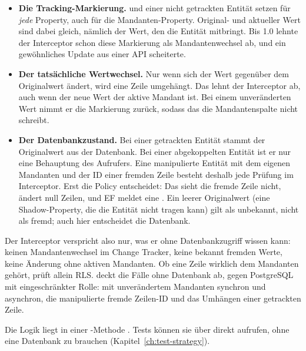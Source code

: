 \begin{itemize}
  \item \textbf{Die Tracking-Markierung.}  und
     einer nicht getrackten Entität setzen  für
    \emph{jede} Property, auch für die Mandanten-Property. Original- und aktueller Wert sind
    dabei gleich, nämlich der Wert, den die Entität mitbringt. Bis 1.0 lehnte der Interceptor
    schon diese Markierung als Mandantenwechsel ab, und ein gewöhnliches Update aus einer API
    scheiterte.
  \item \textbf{Der tatsächliche Wertwechsel.} Nur wenn sich der Wert gegenüber dem
    Originalwert ändert, wird eine Zeile umgehängt. Das lehnt der Interceptor ab, auch wenn
    der neue Wert der aktive Mandant ist. Bei einem unveränderten Wert nimmt er die Markierung
    zurück, sodass das  die Mandantenspalte nicht schreibt.
  \item \textbf{Der Datenbankzustand.} Bei einer getrackten Entität stammt der Originalwert
    aus der Datenbank. Bei einer abgekoppelten Entität ist er nur eine Behauptung des
    Aufrufers. Eine manipulierte Entität mit dem eigenen Mandanten und der ID einer fremden Zeile
    besteht deshalb jede Prüfung im Interceptor. Erst die Policy entscheidet: Das
     sieht die fremde Zeile nicht, ändert null Zeilen, und EF meldet eine
    . Ein leerer
    Originalwert (eine Shadow-Property, die die Entität nicht tragen kann) gilt als unbekannt,
    nicht als fremd; auch hier entscheidet die Datenbank.
\end{itemize}

Der Interceptor verspricht also nur, was er ohne Datenbankzugriff wissen kann: keinen
Mandantenwechsel im Change Tracker, keine bekannt fremden Werte, keine Änderung ohne aktiven
Mandanten. Ob eine Zeile wirklich dem Mandanten gehört, prüft allein RLS.
 deckt die Fälle
ohne Datenbank ab,  gegen PostgreSQL mit
eingeschränkter Rolle:  mit unverändertem Mandanten synchron und asynchron, die
manipulierte fremde Zeilen-ID und das Umhängen einer getrackten Zeile.

Die Logik liegt in einer -Methode . Tests
können sie über  direkt aufrufen, ohne
eine Datenbank zu brauchen (Kapitel~\ref{ch:test-strategy}).

